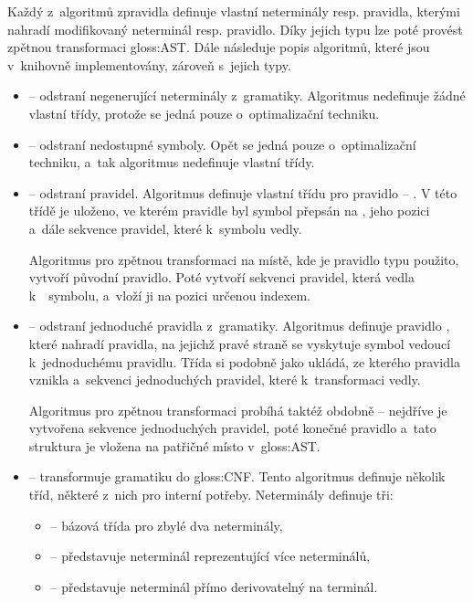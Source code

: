 		Každý z~algoritmů zpravidla definuje vlastní neterminály resp. pravidla, kterými nahradí modifikovaný neterminál resp. pravidlo. Díky jejich typu lze poté provést zpětnou transformaci \gls{gloss:AST}. Dále následuje popis algoritmů, které jsou v~knihovně implementovány, zároveň s~jejich typy.
		
		\begin{itemize}
			\item {} -- odstraní negenerující neterminály z~gramatiky. Algoritmus nedefinuje žádné vlastní třídy, protože se jedná pouze o~optimalizační techniku.
			
			\item {} -- odstraní nedostupné symboly. Opět se jedná pouze o~optimalizační techniku, a~tak algoritmus nedefinuje vlastní třídy.
			
			\item {} -- odstraní \EpsS pravidel. Algoritmus definuje vlastní třídu pro pravidlo -- . V této třídě je uloženo, ve kterém pravidle byl symbol přepsán na \EpsS, jeho pozici a~dále sekvence pravidel, které k~\EpsS symbolu vedly.
			
			Algoritmus pro zpětnou transformaci na místě, kde je pravidlo typu  použito, vytvoří původní pravidlo. Poté vytvoří sekvenci pravidel, která vedla k~\Eps~symbolu, a~vloží ji na pozici určenou indexem.
			
			\item {} -- odstraní jednoduché pravidla z~gramatiky. Algoritmus definuje pravidlo , které nahradí pravidla, na jejichž pravé straně se vyskytuje symbol vedoucí k~jednoduchému pravidlu. Třída  si podobně jako  ukládá, ze kterého pravidla vznikla a~sekvenci jednoduchých pravidel, které k~transformaci vedly.
			
			Algoritmus pro zpětnou transformaci probíhá taktéž obdobně -- nejdříve je vytvořena sekvence jednoduchých pravidel, poté konečné pravidlo a~tato struktura je vložena na patřičné místo v~\gls{gloss:AST}.
			
			\item {} -- transformuje gramatiku do \gls{gloss:CNF}. Tento algoritmus definuje několik tříd, některé z~nich pro interní potřeby. Neterminály definuje tři:
			\begin{itemize}
				\item {} -- bázová třída pro zbylé dva neterminály,
				\item {} -- představuje neterminál reprezentující více neterminálů,
				\item {} -- představuje neterminál přímo derivovatelný na terminál.
			\end{itemize}
		

\end{itemize}
